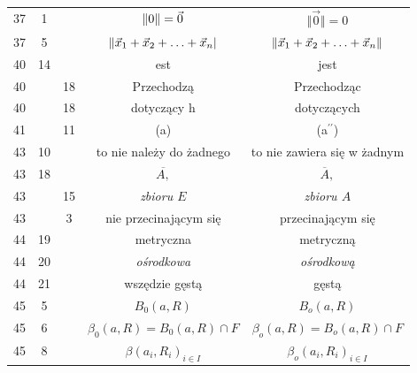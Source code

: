 \documentclass[a4paper,11pt]{article}
\begin{document}
\begin{center}
\begin{tabular}{|c|c|c|c|c|}
    37  &  1 & & $\Vert 0 \Vert = \vec{ 0 }$ & $\Vert \vec{ 0 } \Vert = 0$ \\
    37  &  5 & & $\Vert \vec{ x }_{ 1 } + \vec{ x }_{ 2 } + \ldots + \vec{ x }_{ n } |$
           & $\Vert \vec{ x }_{ 1 } + \vec{ x }_{ 2 } + \ldots + \vec{ x }_{ n } \Vert$ \\
    40  & 14 & & est & jest \\
    40  & & 18 & Przechodzą & Przechodząc \\
    40  & & 18 & dotyczący h & dotyczących \\
    41  & & 11 & (a) & (a$^{ \prime\prime }$) \\
    43  & 10 & & to nie należy do żadnego & to nie zawiera się w żadnym \\
    43  & 18 & & $\overline{A,}$ & $\overline{A},$ \\
    43  & & 15 & \emph{zbioru $E$} & \emph{zbioru $A$} \\
    43  & &  3 & nie przecinającym się & przecinającym się \\
    44  & 19 & & metryczna & metryczną \\
    44  & 20 & & \emph{ośrodkowa} & \emph{ośrodkową} \\
    44  & 21 & & wszędzie gęstą & gęstą \\
    45  &  5 & & $B_{ 0 }( a, R )$ & $B_{ o }( a, R )$ \\
    45  &  6 & & $\beta_{ 0 }( a, R ) = B_{ 0 }( a, R ) \cap F$
           & $\beta_{ o }( a, R ) = B_{ o }( a, R ) \cap F$ \\
    45  &  8 & & $\beta( a_{ i }, R_{ i } )_{ i \in I }$
           & $\beta_{ o }( a_{ i }, R_{ i } )_{ i \in I }$ \\
    \hline
  \end{tabular}

\end{center}
\end{document}

